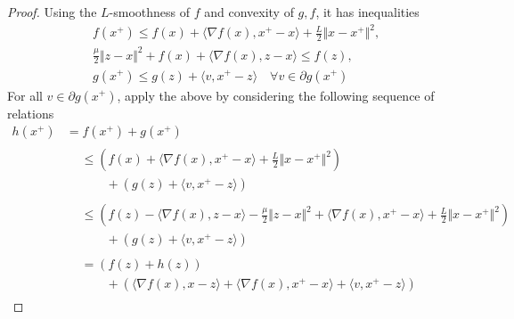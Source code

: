 \documentclass[12pt]{article}
\begin{document}
    \begin{proof}
        Using the $L$-smoothness of $f$ and convexity of $g, f$, it has inequalities
        \begin{align*}
            &f(x^+) \le 
            f(x) + \langle \nabla f(x), x^+ - x\rangle
            + \frac{L}{2}\Vert x - x^+\Vert^2, 
            \\
            &
            \frac{\mu}{2}\Vert z - x\Vert^2+ 
            f(x) + \langle \nabla f(x), z - x\rangle 
            \le f(z), 
            \\
            &g(x^+) \le 
            g(z) + \langle v, x^+ - z\rangle\quad 
            \forall v \in \partial g(x^+)
        \end{align*}
        For all $v \in \partial g (x^+)$, apply the above by considering the following sequence of relations
        \begin{align*}
            h(x^+) &= f(x^+) + g(x^+)
            \\&
            \begin{aligned}
                &\le 
                \left(
                    f(x) + \langle \nabla f(x), x^+ - x\rangle
                    + \frac{L}{2}\Vert x - x^+\Vert^2
                \right)
                \\
                &\qquad  
                + (g(z) + \langle v, x^+ - z\rangle)
            \end{aligned}
            \\&
            \begin{aligned}
                &\le 
                \left(
                    f(z) - \langle \nabla f(x), z - x\rangle
                    - \frac{\mu}{2}\Vert z - x\Vert^2
                    + \langle \nabla f(x), x^+ - x\rangle
                    + 
                    \frac{L}{2}\Vert x - x^+\Vert^2
                \right)
                \\
                &\qquad 
                +
                (g(z) + \langle v, x^+ - z\rangle)
            \end{aligned}
            \\&
            \begin{aligned}
                &= 
                (f(z) + h(z)) 
                \\
                &\qquad 
                + \left(
                    \langle \nabla f(x), x - z\rangle + 
                    \langle \nabla f(x), x^+ - x\rangle + 
                    \langle v, x^+ - z\rangle
                \right) 

\end{aligned}
\end{align*}
\end{proof}
\end{document}
